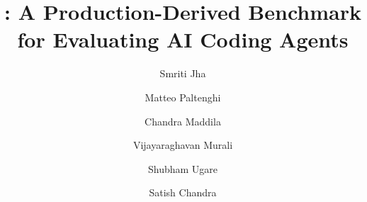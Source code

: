\documentclass[]{meta}
\begin{document}
\title{\benchmark{}: A Production-Derived Benchmark for Evaluating AI Coding Agents}

\author[*]{Smriti Jha}
\author[*]{Matteo Paltenghi}
\author{Chandra Maddila}
\author{Vijayaraghavan Murali}
\author{Shubham Ugare}
\author{Satish Chandra}



\abstract{}

\maketitle






\end{document}
